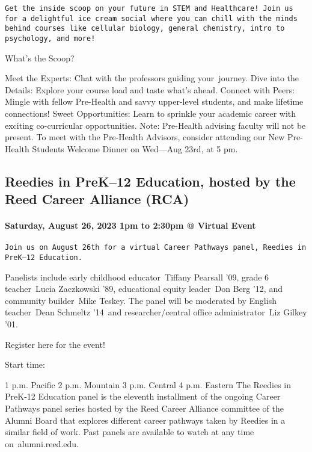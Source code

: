 \documentclass[
]{article}
\begin{document}
\begin{verbatim}
Get the inside scoop on your future in STEM and Healthcare! Join us for a delightful ice cream social where you can chill with the minds behind courses like cellular biology, general chemistry, intro to psychology, and more!
\end{verbatim}

What's the Scoop?

Meet the Experts: Chat with the professors guiding your~journey. Dive
into the Details: Explore your course load and taste what's ahead.
Connect with Peers: Mingle with fellow Pre-Health and savvy upper-level
students, and make lifetime connections! Sweet Opportunities: Learn to
sprinkle your academic career with exciting co-curricular opportunities.
Note: Pre-Health advising faculty will not be present. To meet with the
Pre-Health Advisors, consider attending our New Pre-Health Students
Welcome Dinner on Wed---Aug 23rd, at 5 pm.

\hypertarget{reedies-in-prek12-education-hosted-by-the-reed-career-alliance-rca}{%
\subsection{Reedies in PreK--12 Education, hosted by the Reed Career
Alliance
(RCA)}\label{reedies-in-prek12-education-hosted-by-the-reed-career-alliance-rca}}

\hypertarget{saturday-august-26-2023-1pm-to-230pm-virtual-event}{%
\paragraph{Saturday, August 26, 2023 1pm to 2:30pm @ Virtual
Event}\label{saturday-august-26-2023-1pm-to-230pm-virtual-event}}

\begin{verbatim}
Join us on August 26th for a virtual Career Pathways panel, Reedies in PreK–12 Education.
\end{verbatim}

Panelists include early childhood educator~Tiffany Pearsall '09, grade 6
teacher~Lucia Zaczkowski '89, educational equity leader~Don Berg '12,
and community builder~Mike Teskey. The panel will be moderated by
English teacher~Dean Schmeltz '14~and researcher/central office
administrator~Liz Gilkey '01.

Register here for the event!

Start time:

1 p.m. Pacific 2 p.m. Mountain 3 p.m. Central 4 p.m. Eastern The Reedies
in PreK-12 Education panel is the eleventh installment of the ongoing
Career Pathways panel series hosted by the Reed Career Alliance
committee of the Alumni Board that explores different career pathways
taken by Reedies in a similar field of work. Past panels are available
to watch at any time on~alumni.reed.edu.
\end{document}
